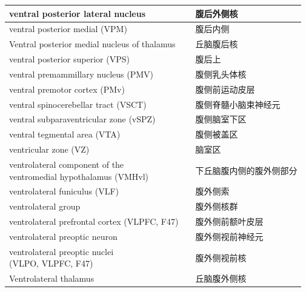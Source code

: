 \begin{longtable}{lll}
	\midrule
	ventral posterior lateral nucleus   && 腹后外侧核  \\
	
	\midrule
	ventral posterior medial (VPM)   && 腹后内侧  \\
	
	\midrule
	Ventral posterior medial nucleus of thalamus   && 丘脑腹后核  \\
	
	\midrule
	ventral posterior superior (VPS)   && 腹后上  \\
	
	\midrule
	ventral premammillary nucleus (PMV)  && 腹侧乳头体核  \\
	
	\midrule
	ventral premotor cortex (PMv)   && 腹侧前运动皮层  \\
	
	\midrule
	ventral spinocerebellar tract (VSCT)   && 腹侧脊髓小脑束神经元  \\
	
	\midrule
	ventral subparaventricular zone (vSPZ)  && 腹侧脑室下区  \\
	
	\midrule
	ventral tegmental area (VTA)   && 腹侧被盖区  \\
	
	\midrule
	ventricular zone (VZ)   && 脑室区  \\
	
	\midrule
	\makecell[l]{ventrolateral component of the \\ventromedial hypothalamus (VMHvl)}  && 下丘脑腹内侧的腹外侧部分  \\
	
	\midrule
	ventrolateral funiculus (VLF)   && 腹外侧索  \\
	
	\midrule
	ventrolateral group   && 腹外侧核群  \\
	
	\midrule
	ventrolateral prefrontal cortex (VLPFC, F47)   && 腹外侧前额叶皮层  \\
	
	\midrule
	ventrolateral preoptic neuron   && 腹外侧视前神经元  \\
	
	\midrule
	\makecell[l]{ventrolateral preoptic nuclei\\ (VLPO, VLPFC, F47)}  && 腹外侧视前核  \\
	
	\midrule
	Ventrolateral thalamus   && 丘脑腹外侧核  \\
	

\end{longtable}
